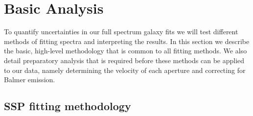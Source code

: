 \section{Basic Analysis}
\label{891_2:sec:anal}

To quantify uncertainties in our full spectrum galaxy fits we will
test different methods of fitting spectra and interpreting the
results. In this section we describe the basic, high-level methodology
that is common to all fitting methods. We also detail preparatory
analysis that is required before these methods can be applied to our
data, namely determining the velocity of each aperture and correcting
for Balmer emission.



\subsection{SSP fitting methodology}
\label{891_2:sec:SSP_method}

